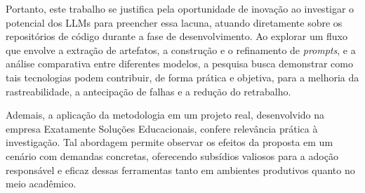 Portanto, este trabalho se justifica pela oportunidade de inovação ao investigar o potencial dos LLMs para preencher essa lacuna, atuando diretamente sobre os repositórios de código durante a fase de desenvolvimento. Ao explorar um fluxo que envolve a extração de artefatos, a construção e o refinamento de \textit{prompts}, e a análise comparativa entre diferentes modelos, a pesquisa busca demonstrar como tais tecnologias podem contribuir, de forma prática e objetiva, para a melhoria da rastreabilidade, a antecipação de falhas e a redução do retrabalho.

Ademais, a aplicação da metodologia em um projeto real, desenvolvido na empresa Exatamente Soluções Educacionais, confere relevância prática à investigação. Tal abordagem permite observar os efeitos da proposta em um cenário com demandas concretas, oferecendo subsídios valiosos para a adoção responsável e eficaz dessas ferramentas tanto em ambientes produtivos quanto no meio acadêmico.